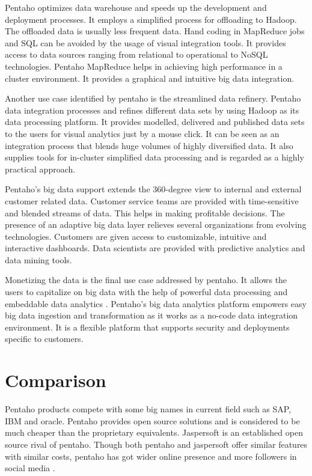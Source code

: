 \documentclass[9pt,twocolumn,twoside]{styles/osajnl}
\begin{document}
Pentaho optimizes data warehouse and speeds up the development and
deployment processes. It employs a simplified process for offloading
to Hadoop. The offloaded data is usually less frequent data. Hand
coding in MapReduce jobs and SQL can be avoided by the usage of visual
integration tools. It provides access to data sources ranging from
relational to operational to NoSQL technologies. Pentaho MapReduce
helps in achieving high performance in a cluster environment. It
provides a graphical and intuitive big data integration.

Another use case identified by pentaho is the streamlined data
refinery. Pentaho data integration processes and refines different
data sets by using Hadoop as its data processing platform. It provides
modelled, delivered and published data sets to the users for visual
analytics just by a mouse click. It can be seen as an integration
process that blends huge volumes of highly diversified data. It also
supplies tools for in-cluster simplified data processing and is
regarded as a highly practical approach.

Pentaho’s big data support extends the 360-degree view to internal and
external customer related data. Customer service teams are provided
with time-sensitive and blended streams of data. This helps in making
profitable decisions. The presence of an adaptive big data layer
relieves several organizations from evolving technologies. Customers
are given access to customizable, intuitive and interactive
dashboards. Data scientists are provided with predictive analytics and
data mining tools.

Monetizing the data is the final use case addressed by pentaho. It
allows the users to capitalize on big data with the help of powerful
data processing and embeddable data analytics \cite{pent9}. Pentaho’s
big data analytics platform empowers easy big data ingestion and
transformation as it works as a no-code data integration
environment. It is a flexible platform that supports security and
deployments specific to customers.

\section{Comparison}

Pentaho products compete with some big names in current field such as
SAP, IBM and oracle. Pentaho provides open source solutions and is
considered to be much cheaper than the proprietary
equivalents. Jaspersoft is an established open source rival of
pentaho. Though both pentaho and jaspersoft offer similar features
with similar costs, pentaho has got wider online presence and more
followers in social media \cite{pent10}.
\end{document}
